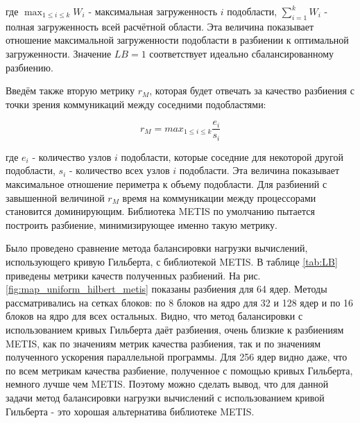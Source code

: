 где $\max_{1 \leq i \leq k} W_i$ - максимальная загруженность $i$ подобласти, $\sum_{i=1}^k W_i$ - полная загруженность всей расчётной области.
Эта величина показывает отношение максимальной загруженности подобласти в разбиении к оптимальной загруженности.
Значение $LB = 1$ соответствует идеально сбалансированному разбиению. 
    
Введём также вторую метрику $r_M$, которая будет отвечать за качество разбиения с точки зрения коммуникаций между соседними подобластями:

\begin{equation} \label{eq:RM}  
    \displaystyle { r_M = max_{1 \leq i \leq k} \frac{e_i}{s_i} }
\end{equation} 

где $e_i$ - количество узлов $i$ подобласти, которые соседние для некоторой другой подобласти, $s_i$ - количество всех узлов $i$ подобласти.
Эта величина показывает максимальное отношение периметра к объему подобласти. 
Для разбиений с завышенной величиной $r_M$ время на коммуникации между процессорами становится доминирующим.
Библиотека METIS по умолчанию пытается построить разбиение, минимизирующее именно такую метрику.
   
Было проведено сравнение метода балансировки нагрузки вычислений, использующего кривую Гильберта, с библиотекой METIS.
В таблице \ref{tab:LB} приведены метрики качеств полученных разбиений. 
На рис. \ref{fig:map_uniform_hilbert_metis} показаны разбиения для 64 ядер. 
Методы рассматривались на сетках блоков: по 8 блоков на ядро для 32 и 128 ядер и по 16 блоков на ядро для всех остальных. 
Видно, что метод балансировки с использованием кривых Гильберта даёт разбиения, очень близкие к разбиениям METIS, как по значениям метрик качества разбиения, так и по значениям полученного ускорения параллельной программы.    
Для 256 ядер видно даже, что по всем метрикам качества разбиение, полученное с помощью кривых Гильберта, немного лучше чем METIS.
Поэтому можно сделать вывод, что для данной задачи метод балансировки нагрузки вычислений с использованием кривой Гильберта - это хорошая альтернатива библиотеке METIS.   
    
